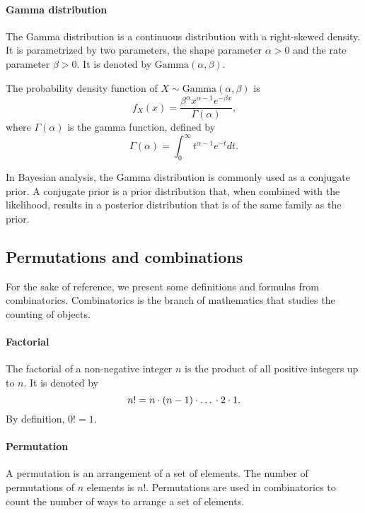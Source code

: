 \paragraph{Gamma distribution} The Gamma distribution is a continuous distribution with a
right-skewed density.  It is parametrized by two parameters, the shape parameter $\alpha
> 0$ and the rate parameter $\beta > 0$.  It is denoted by $\text{Gamma}(\alpha, \beta)$.

The probability density function of $X \sim \text{Gamma}(\alpha, \beta)$ is
\begin{equation}
  \label{eq:gamma}
  f_X(x) = \frac{\beta^\alpha x^{\alpha - 1} e^{-\beta x}}{\Gamma(\alpha)}\text{,}
\end{equation}
where $\Gamma(\alpha)$ is the gamma function, defined by
\begin{equation}
  \label{eq:gammaf}
  \Gamma(\alpha) = \int_0^\infty t^{\alpha - 1} e^{-t} dt\text{.}
\end{equation}

In Bayesian analysis, the Gamma distribution is commonly used as a conjugate prior.
A conjugate prior is a prior distribution that, when combined with the likelihood,
results in a posterior distribution that is of the same family as the prior.

\subsection{Permutations and combinations}

For the sake of reference, we present some definitions and formulas from
combinatorics. Combinatorics is the branch of mathematics that studies the counting of
objects.

\paragraph{Factorial}  The factorial of a non-negative integer $n$ is the product of all
positive integers up to $n$.  It is denoted by
\[
  n! = n \cdot (n - 1) \cdot \text\dots \cdot 2 \cdot 1\text{.}
\]
By definition, $0! = 1$.

\paragraph{Permutation}  A permutation is an arrangement of a set of elements.  The
number of permutations of $n$ elements is $n!$.  Permutations are used in combinatorics
to count the number of ways to arrange a set of elements.

